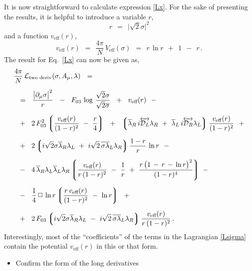 \documentclass[epsfig,12pt]{article}
\def\beq{\begin{equation}}
\def\eeq{\end{equation}}
\newcommand{\cell}{{\mathcal L}}
\newcommand{\p}{\partial}
\newcommand{\ov}{\overline}
\newcommand{\md}{\mathcal{D}}
\newcommand{\lgr}{\left\lgroup}
\newcommand{\rgr}{\right\rgroup}
\begin{document}
	It is now straightforward to calculate expression \eqref{Lx}. 
	For the sake of presenting the results, it is helpful to introduce a variable $ r $,
\beq
	r    ~~=~~    \big|\sqrt{2}\sigma\big|^2
\eeq
	and a function $ v_\text{eff}(r) $,
\beq
	v_\text{eff}(r)    ~~=~~    \frac{4\pi}{N}\, V_\text{eff}(\sigma)    ~~=~~    r\, \ln r  ~~+~~  1  ~~-~~  r\,.
\eeq
	The result for Eq.~\eqref{Lx} can now be given as,
\begin{align}
%
\notag
	& \frac{4\pi}{N}\, \cell_\text{two deriv}(\sigma, A_\mu, \lambda)    ~~=~~  
	\\[2mm]
%
\notag
	& ~~=~~
	\frac{ \big|\p_\mu \sigma\big|^2 } r
	~~-~~
	F_{03}\, \log\, \frac{\sqrt{2}\sigma}{\sqrt{2}\ov\sigma}
	~~+~~
	v_\text{eff}(r)
	~~-
	\\[2mm]
%
\notag
	&
	~~+~~
	2\, F_{03}^2
	\lgr \frac{v_\text{eff}(r)}{(1 - r)^2}  ~-~  \frac{r}{4} \rgr
	~~+~~
	\lgr 
		\ov\lambda{}_R\, i\overleftrightarrow{\md_L} \lambda_R  ~+~ 
		\ov\lambda{}_L\, i\overleftrightarrow{\md_R} \lambda_L
	\rgr
	\frac{v_\text{eff}(r)}{(1 - r)^2}
	~~+
	\\[2mm]
%
\label{Lsigma}
	&
	~~+~~ 
	2 \lgr
		i\sqrt{2}\sigma\ov\lambda{}_R\lambda_L  ~+~  
		i\sqrt{2}\,\ov{\sigma\lambda}{}_L\lambda_R
	\rgr
	\frac{1 - r}{r}\, \ln r
	~~-
	\\[2mm]
%
\notag
	&
	~~-~~
	4\, \ov\lambda{}_R \lambda_L \ov\lambda{}_L \lambda_R
	\lgr
		\frac{v_\text{eff}(r)}{r\, (1 - r)^2}
		~-~  \frac{1}{r}
		~+~  \frac{r\, \big( 1 \,-\, r \,-\, \ln r \big)^2}{ (1 - r)^4 }
	\rgr
	~-
	\\[2mm]
%
\notag
	&
	~~-~~
	\frac{1}{4}\,\Box\,\ln r
	\lgr
		\frac{r\, v_\text{eff}(r)}{(1 - r)^2}  ~-~  \ln r
	\rgr
	~~+
	\\[2mm]
%
\notag
	&
	~~+~~
	2\, F_{03} \lgr 
			i\sqrt{2}\sigma\ov\lambda{}_R\lambda_L ~-~
			i\sqrt{2}\,\ov{\sigma\lambda}{}_L\lambda_R
		   \rgr
	\frac{v_\text{eff}(r)}{r\, (1 - r)^2}\,.
\end{align}
	Interestingly, most of the ``coefficients'' of the terms in the Lagrangian \eqref{Lsigma} contain 
	the potential $ v_\text{eff}(r) $ in this or that form.




\pagebreak
\begin{itemize}
\item
	Confirm the form of the long derivatives
\end{itemize}

\end{document}
